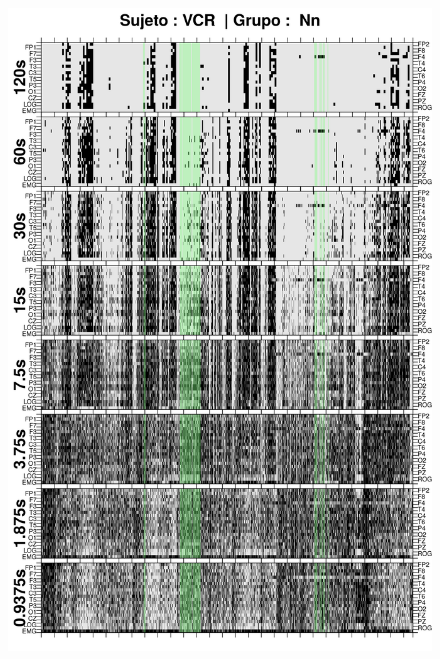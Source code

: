 
\begin{figure}
\centering
\includegraphics[width=0.9\linewidth]
{./img_ejemplos/VCNNS1_comp_est_.png} 
\end{figure}

